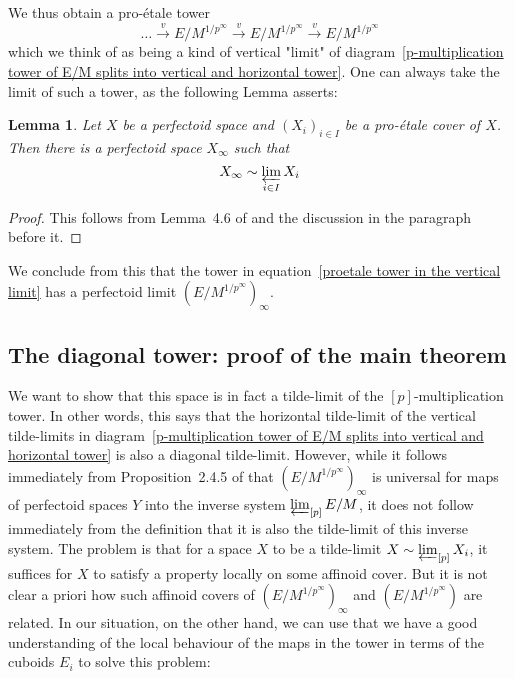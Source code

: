 \documentclass[11pt,oneside]{amsart}
\newtheorem{lemma}[theorem]{Lemma}
\theoremstyle{definition}
\theoremstyle{remark}
\begin{document}
	We thus obtain a pro-\'etale tower
	\begin{equation}\label{proetale tower in the vertical limit}
	\dots \xrightarrow{v}E/M^{1/p^\infty}\xrightarrow{v} E/M^{1/p^\infty}\xrightarrow{v} E/M^{1/p^\infty}
	\end{equation}
	which we think of as being a kind of vertical "limit" of diagram~\ref{p-multiplication tower of E/M splits into vertical and horizontal tower}. One can always take the limit of such a tower, as the following Lemma asserts:
	\begin{lemma}\label{proetale over perfectoid has perfectoid tilde limit}
		Let $X$ be a perfectoid space and $(X_i)_{i\in I}$ be a pro-\'etale cover of $X$. Then there is a perfectoid space $X_\infty$ such that
		\[X_\infty \sim \varprojlim_{i \in I}X_i\]
	\end{lemma}
	\begin{proof}
		This follows from Lemma~4.6 of \cite{p-adic Hodge} and the discussion in the paragraph before it.
	\end{proof}
	
	We conclude from this that the tower in equation~\ref{proetale tower in the vertical limit} has a perfectoid limit $(E/M^{1/p^\infty})_\infty$. 
	
	\subsection{The diagonal tower: proof of the main theorem}
	We want to show that this space is in fact a tilde-limit of the $[p]$-multiplication tower. In other words, this says that the horizontal tilde-limit of the vertical tilde-limits in diagram~\ref{p-multiplication tower of E/M splits into vertical and horizontal tower} is also a diagonal tilde-limit.
	However, while it follows immediately from Proposition~2.4.5 of \cite{SW} that $(E/M^{1/p^\infty})_\infty$ is universal for maps of perfectoid spaces $Y$ into the inverse system $\varprojlim_{[p]}E/M$, it does not follow immediately from the definition that it is also the tilde-limit of this inverse system. The problem is that for a space $X$ to be a tilde-limit $X\sim \varprojlim_{[p]}X_i$, it suffices for $X$ to satisfy a property locally on some affinoid cover. But it is not clear a priori how such affinoid covers of $(E/M^{1/p^\infty})_\infty$ and  $(E/M^{1/p^\infty})$ are related.
	In our situation, on the other hand, we can use that we have a good understanding of the local behaviour of the maps in the tower in terms of the cuboids $E_i$ to solve this problem:
	
\end{document}
